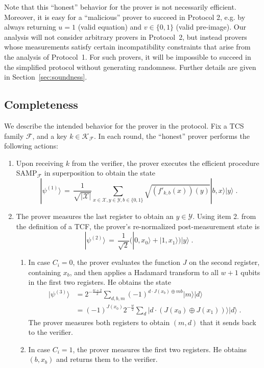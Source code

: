 \documentclass[11pt]{article}
\theoremstyle{remark}
\theoremstyle{definition}
\newcommand{\ket}[1]{|#1\rangle}
\newcommand{\mY}{\ensuremath{\mathcal{Y}}}
\newcommand{\inj}{J}
\newcommand{\sX}{\mathcal{X}}
\newcommand{\sY}{\mathcal{Y}}
\begin{document}
Note that this ``honest'' behavior for the prover is not necessarily efficient. Moreover, it is easy for a ``malicious'' prover to succeed in Protocol 2, e.g. by always returning $u=1$ (valid equation) and $v\in\{0,1\}$ (valid pre-image). Our analysis will not consider arbitrary provers in Protocol~2, but instead provers whose measurements satisfy certain incompatibility constraints that arise from the analysis of Protocol~1. For such provers, it will be impossible to succeed in the simplified protocol without generating randomness. Further details are given in Section~\ref{sec:soundness}.


\subsection{Completeness}
\label{sec:completeness}

We describe the intended behavior for the prover in the protocol. Fix a TCS family $\mathcal{F}$, and a key $k\in\mathcal{K}_\mathcal{F}$. In each round, the ``honest'' prover performs the following actions:
\begin{enumerate}
\item Upon receiving $k$ from the verifier, the prover executes the efficient procedure  SAMP$_{\mathcal{F}}$ in superposition to obtain the state
\[ \ket{\psi^{(1)}}\,=\,    \frac{1}{\sqrt{|\sX|}}\sum_{x\in \sX,y\in \sY,b\in\{0,1\}}\sqrt{(f'_{k,b}(x))(y)}\ket{b,x}\ket{y}\;.\]
\item The prover measures the last register to obtain an $y\in\mY$. Using item 2. from the definition of a TCF, the prover's re-normalized post-measurement state is
\[\ket{\psi^{(2)}} \,=\, \frac{1}{\sqrt{2}}\big(\ket{0,x_0}+\ket{1,x_1}\big)\ket{y}\;.\]
\begin{enumerate}
\item In case $C_i=0$, the prover evaluates the function $\inj$ on the second register, containing $x_b$, and then applies a Hadamard transform to all $w+1$ qubits in the first two registers. He obtains the state 
\begin{align*}
\ket{\psi^{(3)}} &= 2^{-\frac{w+2}{2}}  \sum_{d,b,m} (-1)^{d\cdot \inj(x_b)\oplus mb} \ket{m}\ket{d}\\
&= (-1)^{\inj(x_0)} 2^{-\frac{w}{2}}  \sum_{d} \ket{d\cdot (\inj(x_0)\oplus \inj(x_1))}\ket{d}\;.
\end{align*}
The prover measures both registers to obtain $(m,d)$ that it sends back to the verifier. 
\item In case $C_i=1$, the prover measures the first two registers. He obtains $(b,x_b)$ and returns them to the verifier.
\end{enumerate}
\end{enumerate}
\end{document}
